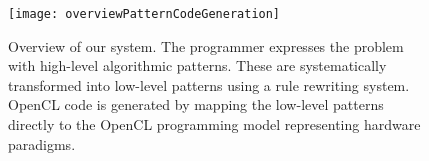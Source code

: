 \begin{figure}[t]
\centering
\texttt{[image: overviewPatternCodeGeneration]}
\vspace{-19pt}
\caption{
Overview of our system.
The programmer expresses the problem with high-level algorithmic patterns.
These are systematically transformed into low-level patterns using a rule rewriting system.
OpenCL code is generated by mapping the low-level patterns directly to the OpenCL programming model representing hardware paradigms.
\vspace{-1em}}
\label{fig:highlevel}
\end{figure}






